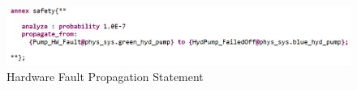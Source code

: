 \begin{figure}[h!]
	\vspace{-0.2in}
	\begin{center}
	\includegraphics[width=1.0\textwidth]{images/hw_prop_stmt.png}
	\end{center}
	\vspace{-0.3in}
	\caption{Hardware Fault Propagation Statement}
	\label{fig:hwFaultProp}
	\vspace{-0.2in}
\end{figure}

